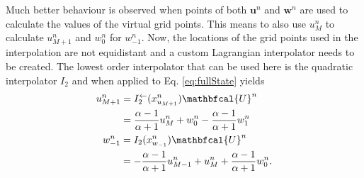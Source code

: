 Much better behaviour is observed when points of both $\mathbf{u}^n$ and $\mathbf{w}^n$ are used to calculate the values of the virtual grid points. This means to also use $u_M^n$ to calculate $u_{M+1}^n$ and $w_0^n$ for $w_{-1}^n$. Now, the locations of the grid points used in the interpolation are not equidistant and a custom Lagrangian interpolator needs to be created. The lowest order interpolator that can be used here is the quadratic interpolator $I_2$ and when applied to Eq. \eqref{eq:fullState} yields
\begin{subequations}\label{eq:connectionInterpol}
\begin{align}
    &\begin{aligned}\label{eq:calcUMP1}
        u_{M+1}^n &= I_2^\flip(x^n_{u_{M+1}})\mathbfcal{U}^n\\
        &= \frac{\alpha - 1}{\alpha + 1}u_{M}^n + w_0^n - \frac{\alpha - 1}{\alpha + 1}w_1^n
    \end{aligned}\\
    &\ \ \begin{aligned}\label{eq:calcWM1}
        w_{-1}^n &= I_2(x^n_{w_{-1}})\mathbfcal{U}^n \\
        &=-\frac{\alpha - 1}{\alpha + 1}u_{M-1}^n + u_{M}^n+ \frac{\alpha - 1}{\alpha + 1}w_{0}^n.
    \end{aligned}
\end{align}
\end{subequations}
